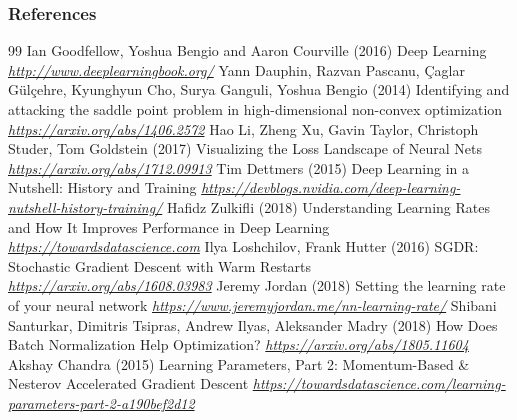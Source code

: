 \begin{vbframe}
\frametitle{References}
\footnotesize{
\begin{thebibliography}{99}
 Ian Goodfellow, Yoshua Bengio and Aaron Courville (2016)
\newblock Deep Learning
\newblock \emph{\url{http://www.deeplearningbook.org/}}
 Yann Dauphin, Razvan Pascanu, {\c{C}}aglar G{\"{u}}l{\c{c}}ehre, Kyunghyun Cho, Surya Ganguli, Yoshua Bengio (2014)
\newblock Identifying and attacking the saddle point problem in high-dimensional non-convex optimization
\newblock \emph{\url{https://arxiv.org/abs/1406.2572}}
 Hao Li, Zheng Xu, Gavin Taylor, Christoph Studer, Tom Goldstein (2017)
\newblock Visualizing the Loss Landscape of Neural Nets
\newblock \emph{\url{https://arxiv.org/abs/1712.09913}}
 Tim Dettmers (2015)
\newblock Deep Learning in a Nutshell: History and Training
\newblock \emph{\url{https://devblogs.nvidia.com/deep-learning-nutshell-history-training/}}
 Hafidz Zulkifli (2018)
\newblock Understanding Learning Rates and How It Improves Performance in Deep Learning
\newblock \emph{\url{https://towardsdatascience.com}}
 Ilya Loshchilov, Frank Hutter (2016)
\newblock SGDR: Stochastic Gradient Descent with Warm Restarts
\newblock \emph{\url{https://arxiv.org/abs/1608.03983}}
 Jeremy Jordan (2018)
\newblock Setting the learning rate of your neural network
\newblock \emph{\url{https://www.jeremyjordan.me/nn-learning-rate/}}
 Shibani Santurkar, Dimitris Tsipras, Andrew Ilyas, Aleksander Madry (2018)
\newblock How Does Batch Normalization Help Optimization?
\newblock \emph{\url{https://arxiv.org/abs/1805.11604}}
 Akshay Chandra (2015) 
\newblock Learning Parameters, Part 2: Momentum-Based \& Nesterov Accelerated Gradient Descent
\newblock \emph{\url{https://towardsdatascience.com/learning-parameters-part-2-a190bef2d12}}
\end{thebibliography}
}
\end{vbframe}


